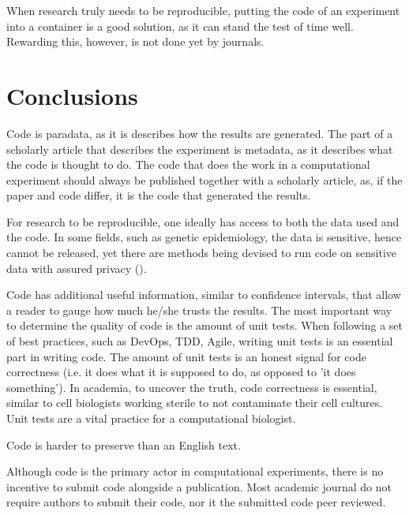 
When research truly needs to be reproducible, putting the code 
of an experiment into a container is a good solution, as it 
can stand the test of time well. Rewarding this, however, is not
done yet by journals.

\section{Conclusions}

Code is paradata, as it is describes how the results are generated.
The part of a scholarly article that describes the experiment is metadata, 
as it describes what the code is thought to do.
The code that does the work in a computational experiment should
always be published together with a scholarly article,
as, if the paper and code differ, it is the code that generated the results.

For research to be reproducible, one ideally has access to
both the data used and the code.
In some fields, such as genetic epidemiology, the data is
sensitive, hence cannot be released,
yet there are methods being devised to run code on sensitive
data with assured privacy (\cite{zhang2016review,azencott2018machine}).

Code has additional useful information, similar to confidence intervals,
that allow a reader to gauge how much he/she trusts the results.
The most important way to determine the quality of code
is the amount of unit tests.
When following a set of best practices, such as DevOps, TDD, Agile,
writing unit tests is an essential 
part in writing code.
The amount of unit tests is an honest signal 
for code correctness (i.e. it does what it is supposed to do, as opposed
to 'it does something').
In academia, to uncover the truth, code correctness is essential,
similar to cell biologists working sterile to not contaminate their
cell cultures.
Unit tests are a vital practice for a computational biologist.

Code is harder to preserve than an English text.

Although code is the primary actor in computational experiments,
there is no incentive to submit code alongside a publication.
Most academic journal do not require authors to submit their code,
nor it the submitted code peer reviewed.

